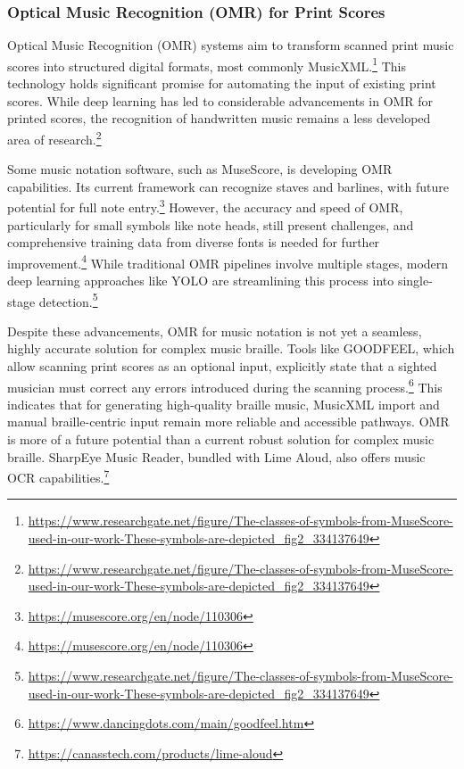 \subsubsection{Optical Music Recognition (OMR) for Print Scores}
Optical Music Recognition (OMR) systems aim to transform scanned print music scores into structured digital formats, most commonly MusicXML.\footnote{\url{https://www.researchgate.net/figure/The-classes-of-symbols-from-MuseScore-used-in-our-work-These-symbols-are-depicted_fig2_334137649}} This technology holds significant promise for automating the input of existing print scores. While deep learning has led to considerable advancements in OMR for printed scores, the recognition of handwritten music remains a less developed area of research.\footnote{\url{https://www.researchgate.net/figure/The-classes-of-symbols-from-MuseScore-used-in-our-work-These-symbols-are-depicted_fig2_334137649}}

Some music notation software, such as MuseScore, is developing OMR capabilities. Its current framework can recognize staves and barlines, with future potential for full note entry.\footnote{\url{https://musescore.org/en/node/110306}} However, the accuracy and speed of OMR, particularly for small symbols like note heads, still present challenges, and comprehensive training data from diverse fonts is needed for further improvement.\footnote{\url{https://musescore.org/en/node/110306}} While traditional OMR pipelines involve multiple stages, modern deep learning approaches like YOLO are streamlining this process into single-stage detection.\footnote{\url{https://www.researchgate.net/figure/The-classes-of-symbols-from-MuseScore-used-in-our-work-These-symbols-are-depicted_fig2_334137649}}

Despite these advancements, OMR for music notation is not yet a seamless, highly accurate solution for complex music braille. Tools like GOODFEEL, which allow scanning print scores as an optional input, explicitly state that a sighted musician must correct any errors introduced during the scanning process.\footnote{\url{https://www.dancingdots.com/main/goodfeel.htm}} This indicates that for generating high-quality braille music, MusicXML import and manual braille-centric input remain more reliable and accessible pathways. OMR is more of a future potential than a current robust solution for complex music braille. SharpEye Music Reader, bundled with Lime Aloud, also offers music OCR capabilities.\footnote{\url{https://canasstech.com/products/lime-aloud}}

